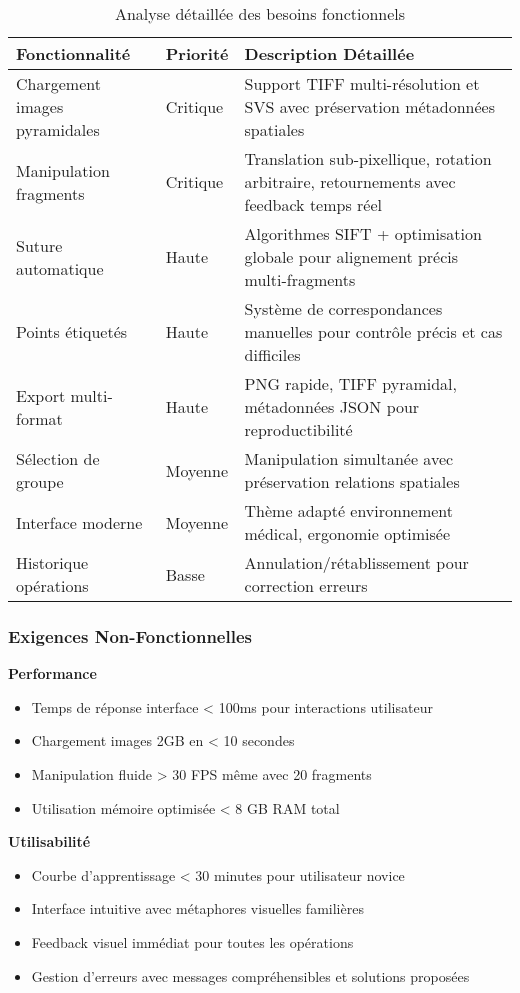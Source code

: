 \documentclass[12pt,a4paper]{report}
\begin{document}
\begin{table}[H]
\centering
\begin{tabular}{|p{4cm}|p{2cm}|p{6cm}|}
\hline
\textbf{Fonctionnalité} & \textbf{Priorité} & \textbf{Description Détaillée} \\
\hline
Chargement images pyramidales & Critique & Support TIFF multi-résolution et SVS avec préservation métadonnées spatiales \\
\hline
Manipulation fragments & Critique & Translation sub-pixellique, rotation arbitraire, retournements avec feedback temps réel \\
\hline
Suture automatique & Haute & Algorithmes SIFT + optimisation globale pour alignement précis multi-fragments \\
\hline
Points étiquetés & Haute & Système de correspondances manuelles pour contrôle précis et cas difficiles \\
\hline
Export multi-format & Haute & PNG rapide, TIFF pyramidal, métadonnées JSON pour reproductibilité \\
\hline
Sélection de groupe & Moyenne & Manipulation simultanée avec préservation relations spatiales \\
\hline
Interface moderne & Moyenne & Thème adapté environnement médical, ergonomie optimisée \\
\hline
Historique opérations & Basse & Annulation/rétablissement pour correction erreurs \\
\hline
\end{tabular}
\caption{Analyse détaillée des besoins fonctionnels}
\end{table}

\subsubsection{Exigences Non-Fonctionnelles}

\textbf{Performance}
\begin{itemize}
\item Temps de réponse interface < 100ms pour interactions utilisateur
\item Chargement images 2GB en < 10 secondes
\item Manipulation fluide > 30 FPS même avec 20 fragments
\item Utilisation mémoire optimisée < 8 GB RAM total
\end{itemize}

\textbf{Utilisabilité}
\begin{itemize}
\item Courbe d'apprentissage < 30 minutes pour utilisateur novice
\item Interface intuitive avec métaphores visuelles familières
\item Feedback visuel immédiat pour toutes les opérations
\item Gestion d'erreurs avec messages compréhensibles et solutions proposées
\end{itemize}
\end{document}
